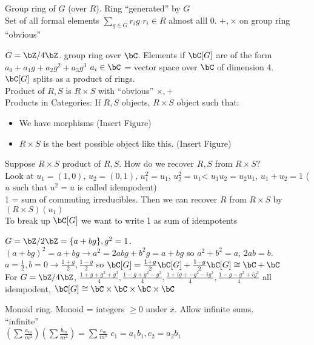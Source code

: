 \begin{example}
    Group ring of $G$ (over $R$). Ring ``generated'' by $G$ \\
    Set of all formal elements $\sum_{g \in G}r_ig$ $r_i \in R$ almost alll 0. $+, \times$ on group ring ``obvious'' 
\end{example}

$G = \bZ/4\bZ$. group ring over $\bC$. Elements if $\bC[G]$ are of the form $a_0 + a_1g+a_2g^2+a_3g^3$ $a_i \in \bC$ = vector space over $\bC$ of dimension 4. \\
$\bC[G]$ splits as a product of rings. \\
Product of $R, S$ is $R \times S$ with ``obvious'' $\times, +$ \\ 

\noindent
Products in Categories: If $R, S$ objects, $R \times S$ object such that: 
\begin{itemize}
    \item We have morphisms (Insert Figure)
    \item $R \times S$ is the best possible object like this. (Insert Figure) 
\end{itemize}

\noindent
Suppose $R \times S$ product of $R, S$. How do we recover $R, S$ from $R \times S$? \\
Look at $u_1 = (1,0)$, $u_2 = (0,1)$, $u_1^2 = u_1$, $u_2^2=u_1$< $u_1u_2 = u_2u_1$, $u_1 + u_2 = 1$ ($u$ such that $u^2=u$ is called idempodent) \\
1 = sum of commuting irreducibles. Then we can recover $R$ from $R \times S$ by $(R \times S)(u_1)$ \\
To break up $\bC[G]$ we want to write 1 as sum of idempotents 

\begin{example}
    $G = \bZ/2\bZ = \{a + bg\}, g^2=1$. $(a+bg)^2 = a+bg \to a^2 = 2abg + b^2g = a+bg$ so $a^2+b^2 = a$, $2ab=b$. $a = \frac{1}{2}, b=0 \to \frac{1 + g}{2}, \frac{1-g}{2}$ so $\bC[G] = \frac{1 + g}{2}\bC[G] + \frac{1-g}{2}\bC[G] \cong \bC + \bC$ \\
    For $G = \bZ/4\bZ$, $\frac{1 + g + g^2 + g^3}{4}, \frac{1 - g + g^2 - g^3}{4}, \frac{1 + ig +-g^2 -ig^3}{4}, \frac{1 - g - g^2 + ig^3}{4}$ all idempodent, $\bC[G] \cong \bC \times \bC \times \bC \times \bC$ 
\end{example}

\begin{example}
    Monoid ring. Monoid = integers $\ge 0$ under $x$. Allow infinite sums. \\
    ``infinite'' \\ 
    $\left( \sum \frac{a_m}{m^2} \right) \left( \sum \frac{b_m}{m^2} \right) = \sum \frac{c_m}{m^s}$ $c_1 = a_1b_1, c_2 = a_2b_1 $ 
\end{example}